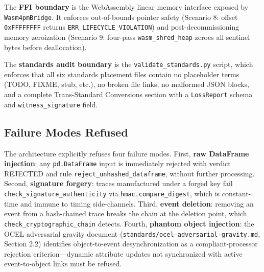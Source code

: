 The \textbf{FFI boundary} is the WebAssembly linear memory interface exposed by
\texttt{Wasm4pmBridge}. It enforces out-of-bounds pointer safety (Scenario 8: offset
\texttt{0xFFFFFFFF} returns \texttt{ERR\_LIFECYCLE\_VIOLATION}) and post-decommissioning
memory zeroization (Scenario 9: four-pass \texttt{wasm\_shred\_heap} zeroes all sentinel
bytes before deallocation).

The \textbf{standards audit boundary} is the \texttt{validate\_standards.py} script, which
enforces that all six standards placement files contain no placeholder terms (TODO, FIXME,
stub, etc.), no broken file links, no malformed JSON blocks, and a complete Trans-Standard
Conversions section with a \texttt{LossReport} schema and \texttt{witness\_signature} field.

\subsection{Failure Modes Refused}
\label{sec:adversarial-architecture-failure-modes}

The architecture explicitly refuses four failure modes. First, \textbf{raw DataFrame
injection}: any \texttt{pd.DataFrame} input is immediately rejected with verdict REJECTED and
rule \texttt{reject\_unhashed\_dataframe}, without further processing. Second,
\textbf{signature forgery}: traces manufactured under a forged key fail
\texttt{check\_signature\_authenticity} via \texttt{hmac.compare\_digest}, which is
constant-time and immune to timing side-channels. Third, \textbf{event deletion}: removing
an event from a hash-chained trace breaks the chain at the deletion point, which
\texttt{check\_cryptographic\_chain} detects. Fourth, \textbf{phantom object injection}:
the OCEL adversarial gravity document (\texttt{standards/ocel-adversarial-gravity.md},
Section 2.2) identifies object-to-event desynchronization as a compliant-processor
rejection criterion---dynamic attribute updates not synchronized with active event-to-object
links must be refused.
